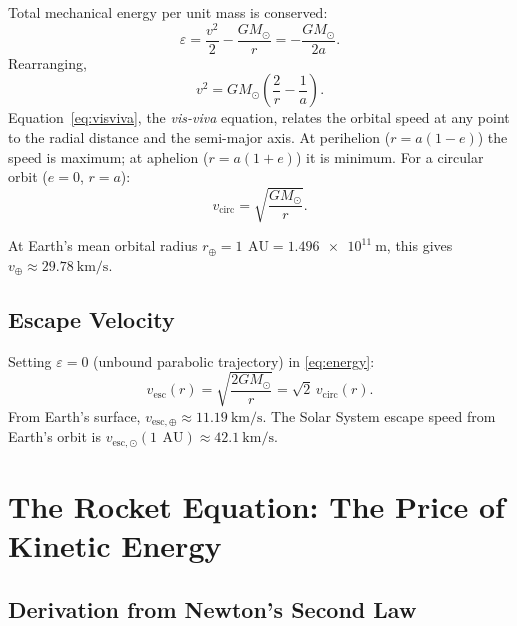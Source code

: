 \documentclass[12pt,a4paper]{article}
\newcommand{\AU}{\,\text{AU}}
\begin{document}
Total mechanical energy per unit mass is conserved:
\begin{equation}
  \varepsilon = \frac{v^2}{2} - \frac{GM_\odot}{r} = -\frac{GM_\odot}{2a}.
  \label{eq:energy}
\end{equation}
Rearranging,
\begin{equation}
  \boxed{v^2 = GM_\odot\!\left(\frac{2}{r} - \frac{1}{a}\right).}
  \label{eq:visviva}
\end{equation}
Equation~\eqref{eq:visviva}, the \emph{vis-viva} equation, relates the orbital
speed at any point to the radial distance and the semi-major axis. At
perihelion ($r = a(1-e)$) the speed is maximum; at aphelion ($r = a(1+e)$) it
is minimum. For a circular orbit ($e=0$, $r=a$):
\begin{equation}
  v_{\mathrm{circ}} = \sqrt{\frac{GM_\odot}{r}}.
  \label{eq:vcirc}
\end{equation}

At Earth's mean orbital radius $r_\oplus = \SI{1}{\AU} = \SI{1.496e11}{\meter}$,
this gives $v_\oplus \approx \SI{29.78}{\kilo\meter\per\second}$.

\subsection{Escape Velocity}

Setting $\varepsilon = 0$ (unbound parabolic trajectory) in \eqref{eq:energy}:
\begin{equation}
  v_{\mathrm{esc}}(r) = \sqrt{\frac{2GM_\odot}{r}} = \sqrt{2}\,v_{\mathrm{circ}}(r).
  \label{eq:vesc}
\end{equation}
From Earth's surface, $v_{\mathrm{esc},\oplus} \approx \SI{11.19}{\kilo\meter\per\second}$.
The Solar System escape speed from Earth's orbit is
$v_{\mathrm{esc},\odot}(\SI{1}{\AU}) \approx \SI{42.1}{\kilo\meter\per\second}$.

\section{The Rocket Equation: The Price of Kinetic Energy}

\subsection{Derivation from Newton's Second Law}
\end{document}
